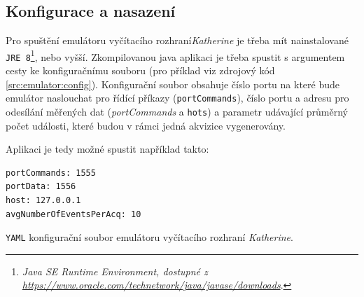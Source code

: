 \subsection{Konfigurace a nasazení}
Pro spuštění emulátoru vyčítacího rozhraní\textit{Katherine} je třeba mít nainstalované \texttt{JRE 8}\footnote{\textit{Java SE Runtime Environment, dostupné z\\\url{https://www.oracle.com/technetwork/java/javase/downloads}}.}, nebo vyšší.
Zkompilovanou java aplikaci je třeba spustit s argumentem cesty ke konfiguračnímu souboru (pro příklad viz zdrojový kód \ref{src:emulator:config}). Konfigurační soubor obsahuje číslo portu na které bude emulátor naslouchat pro řídící příkazy (\texttt{portCommands}), číslo portu a adresu pro odesílání měřených dat (\textit{portCommands} a \texttt{hots}) a parametr udávající průměrný počet události, které budou v rámci jedná akvizice vygenerovány.

Aplikaci je tedy možné spustit například takto: 

\begin{code}[h]
  \begin{verbatim}
portCommands: 1555
portData: 1556
host: 127.0.0.1
avgNumberOfEventsPerAcq: 10
\end{verbatim}
\caption{\texttt{YAML} konfigurační soubor emulátoru vyčítacího rozhraní \textit{Katherine}.}
\label{src:emulator:config}
\end{code}